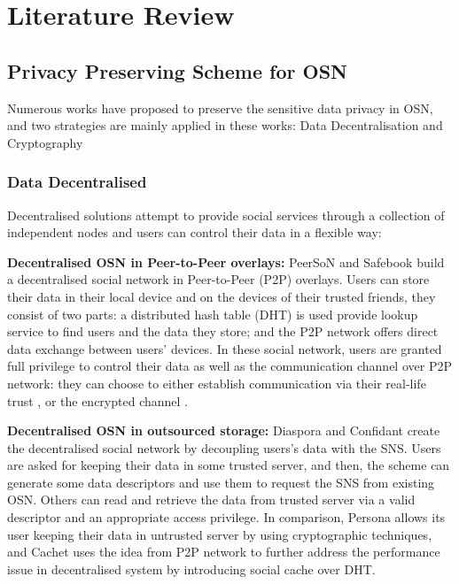 \chapter{Literature Review}

\section{Privacy Preserving Scheme for OSN}
Numerous works have proposed to preserve the sensitive data privacy in OSN, and two strategies are mainly applied in these works: Data Decentralisation and Cryptography

\subsection{Data Decentralised}
Decentralised solutions attempt to provide social services through a collection of independent nodes and users can control their data in a flexible way:

{\bf Decentralised OSN in Peer-to-Peer overlays:} PeerSoN \cite{buchegger2009peerson} and Safebook \cite{cutillo2009safebook} build a decentralised social network in Peer-to-Peer (P2P) overlays. Users can store their data in their local device and on the devices of their trusted friends, they consist of two parts: a distributed hash table (DHT) is used provide lookup service to find users and the data they store; and the P2P network offers direct data exchange between users' devices. In these social network, users are granted full privilege to control their data as well as the communication channel over P2P network: they can choose to either establish communication via their real-life trust \cite{cutillo2009safebook}, or the encrypted channel \cite{buchegger2009peerson}.

{\bf Decentralised OSN in outsourced storage:} Diaspora \cite{diaspora2017diaspora} and Confidant \cite{liu2011confidant} create the decentralised social network by decoupling users's data with the SNS. Users are asked for keeping their data in some trusted server, and then, the scheme can generate some data descriptors and use them to request the SNS from existing OSN. Others can read and retrieve the data from trusted server via a valid descriptor and an appropriate access privilege. In comparison, Persona \cite{baden2009persona} allows its user keeping their data in untrusted server by using cryptographic techniques, and Cachet \cite{nilizadeh2012cachet} uses the idea from P2P network to further address the performance issue in decentralised system by introducing social cache over DHT.

